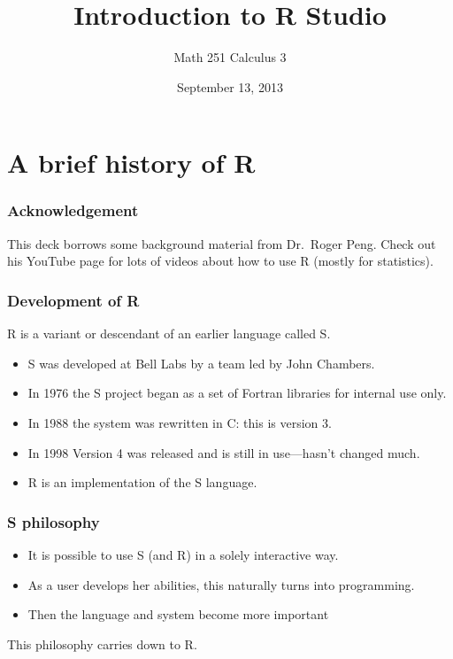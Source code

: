 \documentclass[11pt,ignorenonframetext,aspectratio=169]{beamer}
\title{Introduction to R Studio}
\author{Math 251 Calculus 3}
\date{September 13, 2013 }
\begin{document}
\frame{\titlepage}

\section{A brief history of R}

\begin{frame}\frametitle{Acknowledgement}

This deck borrows some background material from Dr.~Roger Peng. Check
out his YouTube page for lots of videos about how to use R (mostly for
statistics).

\end{frame}

\begin{frame}\frametitle{Development of R}

R is a variant or descendant of an earlier language called S.

\begin{itemize}[<+->]

\item
  S was developed at Bell Labs by a team led by John Chambers.
\item
  In 1976 the S project began as a set of Fortran libraries for internal
  use only.
\item
  In 1988 the system was rewritten in C: this is version 3.
\item
  In 1998 Version 4 was released and is still in use---hasn't changed
  much.
\item
  R is an implementation of the S language.
\end{itemize}

\end{frame}

\begin{frame}\frametitle{S philosophy}

\begin{itemize}[<+->]

\item
  It is possible to use S (and R) in a solely interactive way.
\item
  As a user develops her abilities, this naturally turns into
  programming.
\item
  Then the language and system become more important
\end{itemize}

This philosophy carries down to R.

\end{frame}
\end{document}

